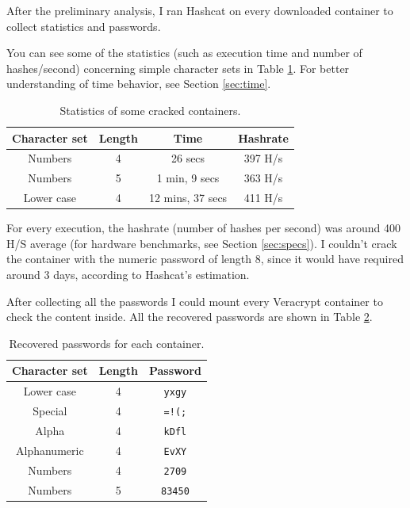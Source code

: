 \documentclass[12pt]{article}
\begin{document}
After the preliminary analysis, I ran Hashcat on every downloaded container to collect statistics and passwords.

You can see some of the statistics (such as execution time and number of hashes/second) concerning simple character sets in Table \ref{table:stats}. For better understanding of time behavior, see Section \ref{sec:time}.

\begin{table}[!ht]
    \centering
    \begin{tabular}{cccc}
    \toprule
        \textbf{Character set} & \textbf{Length} & \textbf{Time} & \textbf{Hashrate}\\ 
        \midrule
        Numbers & 4 & 26 secs & 397 H/s \\ 
        Numbers & 5 & 1 min, 9 secs & 363 H/s \\ 
        Lower case & 4 & 12 mins, 37 secs & 411 H/s \\ 
    \bottomrule
    \end{tabular}
    \caption{Statistics of some cracked containers.}
    \label{table:stats}
\end{table}

For every execution, the hashrate (number of hashes per second) was around 400 H/S average (for hardware benchmarks, see Section \ref{sec:specs}). I couldn't crack the container with the numeric password of length 8, since it would have required around 3 days, according to Hashcat's estimation.

After collecting all the passwords I could mount every Veracrypt container to check the content inside. All the recovered passwords are shown in Table \ref{table:pwd}.

\begin{table}[!ht]
    \centering
    \begin{tabular}{ccc}
    \toprule
        \textbf{Character set} & \textbf{Length} & \textbf{Password} \\ 
        \midrule
        Lower case & 4 & \texttt{yxgy}  \\ 
        Special & 4 & \texttt{=!(;}\\ 
        Alpha & 4 & \texttt{kDfl} \\ 
        Alphanumeric & 4 & \texttt{EvXY} \\ 
        Numbers & 4 & \texttt{2709} \\ 
        Numbers & 5 & \texttt{83450} \\ 
    \bottomrule
    \end{tabular}
    \caption{Recovered passwords for each container.}
    \label{table:pwd}
\end{table}
\end{document}
